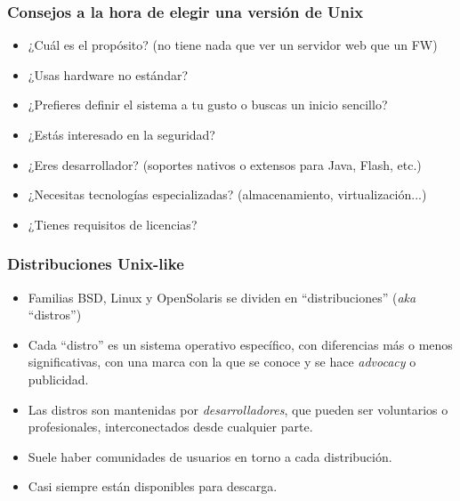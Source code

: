 \documentclass{beamer}
\begin{document}
\begin{frame}
\frametitle{Consejos a la hora de elegir una versión de Unix}

\begin{itemize}

\item ¿Cuál es el propósito? (no tiene nada que ver un servidor web que un FW)
\item ¿Usas hardware no estándar?
\item ¿Prefieres definir el sistema a tu gusto o buscas un inicio sencillo?
\item ¿Estás interesado en la seguridad?
\item ¿Eres desarrollador? (soportes nativos o extensos para Java, Flash, etc.)
\item ¿Necesitas tecnologías especializadas? (almacenamiento, virtualización...)
\item ¿Tienes requisitos de licencias?

\end{itemize}

\end{frame}


\begin{frame}
\frametitle{Distribuciones Unix-like}

\begin{itemize}

\item Familias BSD, Linux y OpenSolaris se dividen en ``distribuciones'' (\textit{aka} ``distros'')
\item Cada ``distro'' es un sistema operativo específico, con diferencias más o menos significativas, con una marca con la que se conoce y se hace \textit{advocacy} o publicidad.
\item Las distros son mantenidas por \textit{desarrolladores}, que pueden ser voluntarios o profesionales, interconectados desde cualquier parte.
\item Suele haber comunidades de usuarios en torno a cada distribución. 
\item Casi siempre están disponibles para descarga.

\end{itemize}

\end{frame}


\end{document}
